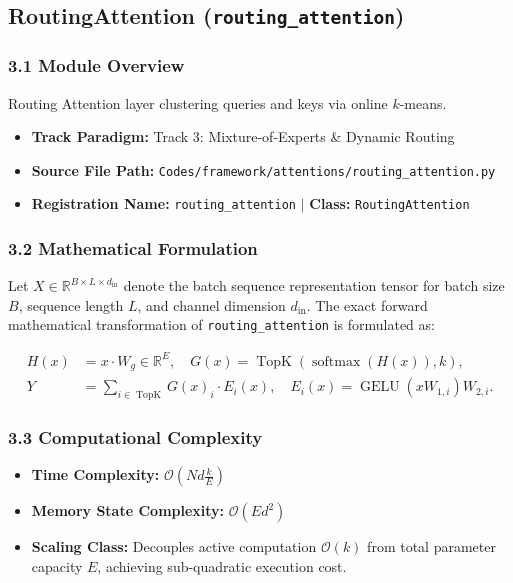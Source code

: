 \subsection{RoutingAttention (\texttt{routing\_attention})}
\label{sec:app_module_routing_attention}

\subsubsection*{3.1 Module Overview}
Routing Attention layer clustering queries and keys via online $k$-means.
\begin{itemize}
    \item \textbf{Track Paradigm:} Track 3: Mixture-of-Experts \& Dynamic Routing
    \item \textbf{Source File Path:} \texttt{Codes/framework/attentions/routing\_attention.py}
    \item \textbf{Registration Name:} \texttt{routing\_attention} $\mid$ \textbf{Class:} \texttt{RoutingAttention}
\end{itemize}

\subsubsection*{3.2 Mathematical Formulation}
Let $X \in \mathbb{R}^{B \times L \times d_{\text{in}}}$ denote the batch sequence representation tensor for batch size $B$, sequence length $L$, and channel dimension $d_{\text{in}}$. The exact forward mathematical transformation of \texttt{routing\_attention} is formulated as:

\begin{align}
H(x) &= x \cdot W_g \in \mathbb{R}^{E}, \quad G(x) = \operatorname{TopK}\left(\operatorname{softmax}(H(x)), k\right), \\
Y &= \sum_{i \in \operatorname{TopK}} G(x)_i \cdot E_i(x), \quad E_i(x) = \operatorname{GELU}(x W_{1, i}) W_{2, i}.
\end{align}


\subsubsection*{3.3 Computational Complexity}
\begin{itemize}
    \item \textbf{Time Complexity:} $\mathcal{O}(N d \frac{k}{E})$
    \item \textbf{Memory State Complexity:} $\mathcal{O}(E d^2)$
    \item \textbf{Scaling Class:} Decouples active computation $\mathcal{O}(k)$ from total parameter capacity $E$, achieving sub-quadratic execution cost.
\end{itemize}

